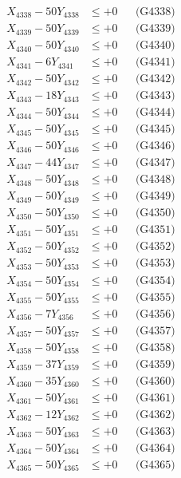 \documentclass[a4paper,10pt]{article}
\begin{document}
{\begin{align}
X_{4338} - 50Y_{4338} &\leq +0 && \text{(G4338)} \\
X_{4339} - 50Y_{4339} &\leq +0 && \text{(G4339)} \\
X_{4340} - 50Y_{4340} &\leq +0 && \text{(G4340)} \\
\allowbreak
X_{4341} - 6Y_{4341} &\leq +0 && \text{(G4341)} \\
X_{4342} - 50Y_{4342} &\leq +0 && \text{(G4342)} \\
X_{4343} - 18Y_{4343} &\leq +0 && \text{(G4343)} \\
X_{4344} - 50Y_{4344} &\leq +0 && \text{(G4344)} \\
X_{4345} - 50Y_{4345} &\leq +0 && \text{(G4345)} \\
X_{4346} - 50Y_{4346} &\leq +0 && \text{(G4346)} \\
X_{4347} - 44Y_{4347} &\leq +0 && \text{(G4347)} \\
X_{4348} - 50Y_{4348} &\leq +0 && \text{(G4348)} \\
X_{4349} - 50Y_{4349} &\leq +0 && \text{(G4349)} \\
X_{4350} - 50Y_{4350} &\leq +0 && \text{(G4350)} \\
\allowbreak
X_{4351} - 50Y_{4351} &\leq +0 && \text{(G4351)} \\
X_{4352} - 50Y_{4352} &\leq +0 && \text{(G4352)} \\
X_{4353} - 50Y_{4353} &\leq +0 && \text{(G4353)} \\
X_{4354} - 50Y_{4354} &\leq +0 && \text{(G4354)} \\
X_{4355} - 50Y_{4355} &\leq +0 && \text{(G4355)} \\
X_{4356} - 7Y_{4356} &\leq +0 && \text{(G4356)} \\
X_{4357} - 50Y_{4357} &\leq +0 && \text{(G4357)} \\
X_{4358} - 50Y_{4358} &\leq +0 && \text{(G4358)} \\
X_{4359} - 37Y_{4359} &\leq +0 && \text{(G4359)} \\
X_{4360} - 35Y_{4360} &\leq +0 && \text{(G4360)} \\
\allowbreak
X_{4361} - 50Y_{4361} &\leq +0 && \text{(G4361)} \\
X_{4362} - 12Y_{4362} &\leq +0 && \text{(G4362)} \\
X_{4363} - 50Y_{4363} &\leq +0 && \text{(G4363)} \\
X_{4364} - 50Y_{4364} &\leq +0 && \text{(G4364)} \\
X_{4365} - 50Y_{4365} &\leq +0 && \text{(G4365)} \\

\end{align}}
\end{document}

